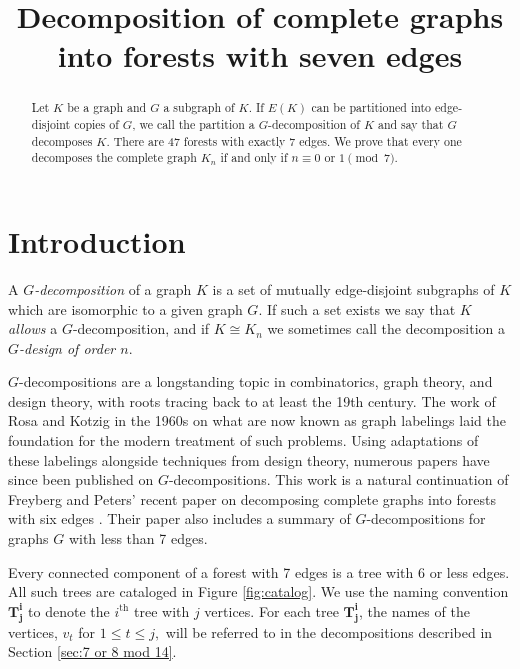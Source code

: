 \documentclass{dmgt}
\title{Decomposition of complete graphs into forests with seven edges}
\begin{document}
\begin{abstract}
 Let $K$ be a graph and $G$ a subgraph of $K$. If $E(K)$ can be partitioned into edge-disjoint copies of $G$, we call the partition a $G$-decomposition of $K$ and say that $G$ decomposes $K.$ There are 47 forests with exactly 7 edges. We prove that every one decomposes the complete graph $K_{n}$ if and only if $n \equiv 0 \textrm{ or }1\pmod{7}.$
\end{abstract}
\section{Introduction}
A \textit{$G$-decomposition} of a graph $K$ is a set of mutually edge-disjoint subgraphs of $K$ which are isomorphic to a given graph $G$. If such a set exists we say that $K$ \textit{allows} a $G$-decomposition, and if $K\cong K_{n}$ we sometimes call the decomposition a \textit{$G$-design of order $n$}.

$G$-decompositions are a longstanding topic in combinatorics, graph theory, and design theory, with roots tracing back to at least the 19th century. The work of Rosa and Kotzig in the 1960s on what are now known as graph labelings laid the foundation for the modern treatment of such problems. Using adaptations of these labelings alongside techniques from design theory, numerous papers have since been published on $G$-decompositions. This work is a natural continuation of Freyberg and Peters' recent paper on decomposing complete graphs into forests with six edges \cite{bib:Peters}. Their paper also includes a summary of $G$-decompositions for graphs $G$ with less than 7 edges.

Every connected component of a forest with 7 edges is a tree with 6 or less edges. All such trees are cataloged in Figure \ref{fig:catalog}. We use the naming convention $\mathbf{T_{j}^i}$ to denote the $i^{\textrm{th}}$ tree with $j$ vertices. For each tree $\mathbf{T_{j}^i}$, the names of the vertices, $v_t$ for $1 \leq t \leq j,$ will be referred to in the decompositions described in Section \ref{sec:7 or 8 mod 14}.
\end{document}
